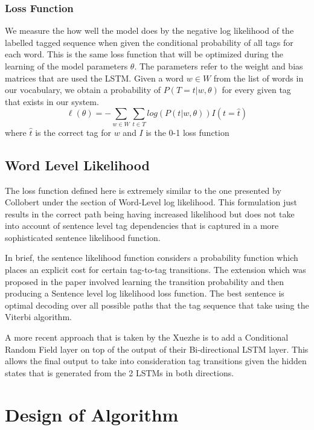 \documentclass[fyp]{socreport}
\begin{document}
\subsubsection{Loss Function} We measure the how well the model does by the
negative log likelihood of the labelled tagged sequence when given the
conditional probability of all tags for each word. This is the same loss
function that will be optimized during the learning of the model parameters
$\theta$. The parameters refer to the weight and bias matrices that are used
the LSTM. Given a word $w \in W$ from the list of words in our vocabulary, we
obtain a probability of $P(T=t | w, \theta)$ for every given tag that exists in
our system.
\begin{equation}
  \ell(\theta) = -\sum_{w \in W} \sum_{t \in T} log(P(t | w, \theta)) I(t = \hat{t})
\end{equation}
where $\hat{t}$ is the correct tag for $w$ and $I$ is the 0-1 loss function

\subsection{Word Level Likelihood}

The loss function defined here is extremely similar to the one presented by
Collobert \cite{DBLP2011Collobert} under the section of Word-Level log
likelihood. This formulation just results in the correct path being having
increased likelihood but does not take into account of sentence level tag
dependencies that is captured in a more sophisticated sentence likelihood
function.

In brief, the sentence likelihood function considers a probability function
which places an explicit cost for certain tag-to-tag transitions. The extension
which was proposed in the paper involved learning the transition probability
and then producing a Sentence level log likelihood loss function. The best
sentence is optimal decoding over all possible paths that the tag sequence that
take using the Viterbi algorithm.

A more recent approach that is taken by the Xuezhe \cite{2016arXiv160301354M}
is to add a Conditional Random Field layer on top of the output of their
Bi-directional LSTM layer. This allows the final output to take into
consideration tag transitions given the hidden states that is
generated from the 2 LSTMs in both directions.


\section{Design of Algorithm}
\end{document}
